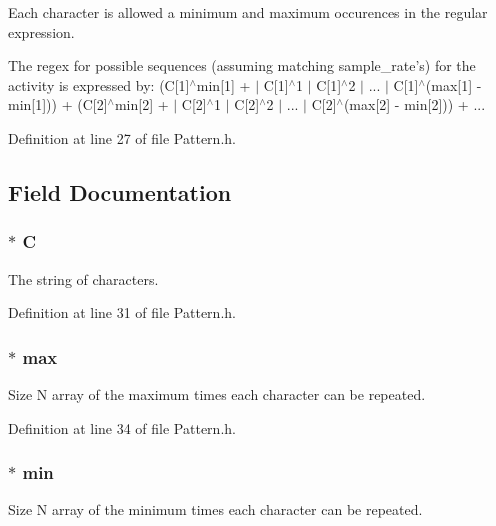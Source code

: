 Each character is allowed a minimum and maximum occurences in the regular expression.

The regex for possible sequences (assuming matching sample\_\-rate's) for the activity is expressed by: (C\mbox{[}1\mbox{]}$^\wedge$min\mbox{[}1\mbox{]} + $|$ C\mbox{[}1\mbox{]}$^\wedge$1 $|$ C\mbox{[}1\mbox{]}$^\wedge$2 $|$ ... $|$ C\mbox{[}1\mbox{]}$^\wedge$(max\mbox{[}1\mbox{]} -\/ min\mbox{[}1\mbox{]})) + (C\mbox{[}2\mbox{]}$^\wedge$min\mbox{[}2\mbox{]} + $|$ C\mbox{[}2\mbox{]}$^\wedge$1 $|$ C\mbox{[}2\mbox{]}$^\wedge$2 $|$ ... $|$ C\mbox{[}2\mbox{]}$^\wedge$(max\mbox{[}2\mbox{]} -\/ min\mbox{[}2\mbox{]})) + ... 

Definition at line 27 of file Pattern.h.



\subsection{Field Documentation}
\hypertarget{struct___pattern_ace6a083ab9219ee974a505ec2e08e9cc}{
\subsubsection[{C}]{$\ast$ {\bf C}}}
\label{struct___pattern_ace6a083ab9219ee974a505ec2e08e9cc}
The string of characters. 

Definition at line 31 of file Pattern.h.

\hypertarget{struct___pattern_a205c3e88cd22e9df2e06e59aad19ef9e}{
\subsubsection[{max}]{$\ast$ {\bf max}}}
\label{struct___pattern_a205c3e88cd22e9df2e06e59aad19ef9e}
Size N array of the maximum times each character can be repeated. 

Definition at line 34 of file Pattern.h.

\hypertarget{struct___pattern_a4f44fb0273d5bdbe12505fc74c4e53c5}{
\subsubsection[{min}]{$\ast$ {\bf min}}}
\label{struct___pattern_a4f44fb0273d5bdbe12505fc74c4e53c5}
Size N array of the minimum times each character can be repeated. 

